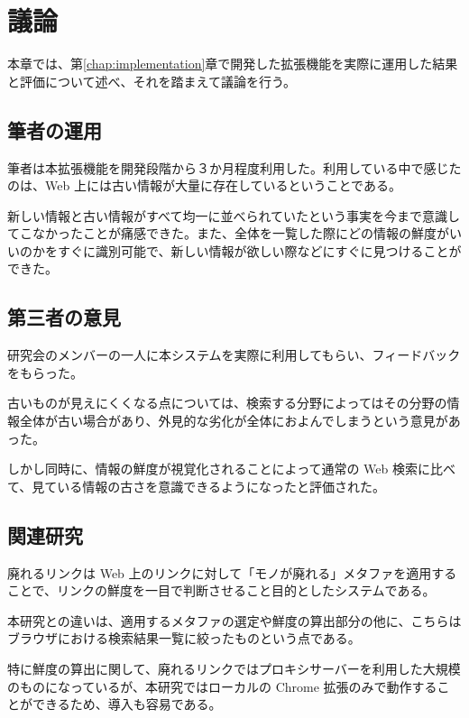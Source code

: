 \chapter{議論}
\label{chap:discussion}

本章では、第\ref{chap:implementation}章で開発した拡張機能を実際に運用した結果と評価について述べ、それを踏まえて議論を行う。

\newpage

\section{筆者の運用}

筆者は本拡張機能を開発段階から３か月程度利用した。利用している中で感じたのは、Web 上には古い情報が大量に存在しているということである。

新しい情報と古い情報がすべて均一に並べられていたという事実を今まで意識してこなかったことが痛感できた。また、全体を一覧した際にどの情報の鮮度がいいのかをすぐに識別可能で、新しい情報が欲しい際などにすぐに見つけることができた。

\section{第三者の意見}

研究会のメンバーの一人に本システムを実際に利用してもらい、フィードバックをもらった。

古いものが見えにくくなる点については、検索する分野によってはその分野の情報全体が古い場合があり、外見的な劣化が全体におよんでしまうという意見があった。

しかし同時に、情報の鮮度が視覚化されることによって通常の Web 検索に比べて、見ている情報の古さを意識できるようになったと評価された。

\section{関連研究}

廃れるリンク\cite{dyinglink}は Web 上のリンクに対して「モノが廃れる」メタファを適用することで、リンクの鮮度を一目で判断させること目的としたシステムである。

本研究との違いは、適用するメタファの選定や鮮度の算出部分の他に、こちらはブラウザにおける検索結果一覧に絞ったものという点である。

特に鮮度の算出に関して、廃れるリンクではプロキシサーバーを利用した大規模のものになっているが、本研究ではローカルの Chrome 拡張のみで動作することができるため、導入も容易である。

